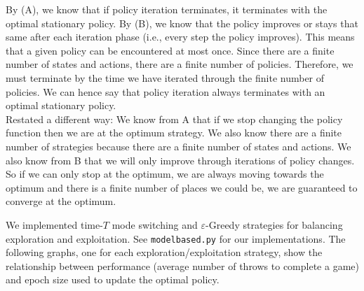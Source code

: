 \documentclass[solution, letterpaper]{cs121}
\begin{document}
\subproblem{} %
By (A), we know that if policy iteration terminates, it terminates with the optimal stationary policy. By (B), we know that the policy improves or stays that same after each iteration phase (i.e., every step the policy improves). This means that a given policy can be encountered at most once. Since there are a finite number of states and actions, there are a finite number of policies. Therefore, we must terminate by the time we have iterated through the finite number of policies. We can hence say that policy iteration always terminates with an optimal stationary policy.\\

Restated a different way: We know from A that if we stop changing the policy function then we are at the optimum strategy. We also know there are a finite number of strategies because there are a finite number of states and actions. We also know from B that we will only improve through iterations of policy changes. So if we can only stop at the optimum, we are always moving towards the optimum and there is a finite number of places we could be, we are guaranteed to converge at the optimum.



\subproblem{} %
We implemented time-$T$ mode switching and $\varepsilon$-Greedy strategies for balancing exploration and exploitation. See {\tt modelbased.py} for our implementations. The following graphs, one for each exploration/exploitation strategy, show the relationship between performance (average number of throws to complete a game) and epoch size used to update the optimal policy.
\end{document}
